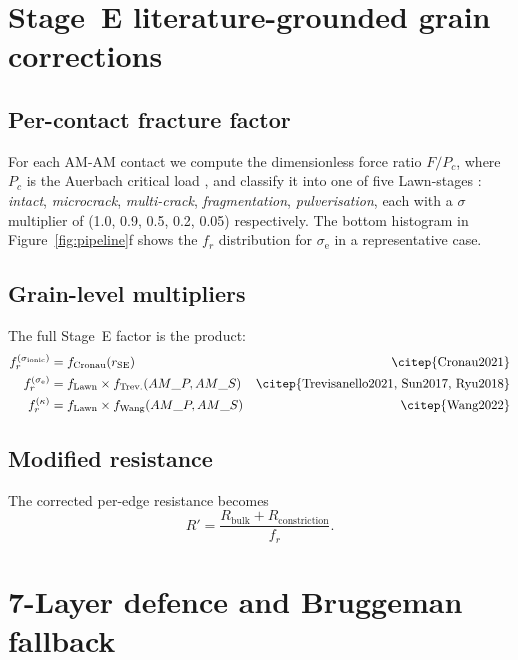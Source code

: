 \documentclass[11pt, a4paper]{article}
\newcommand{\sigmaionic}{\ensuremath{\sigma_{\mathrm{ionic}}}}
\newcommand{\sigmae}{\ensuremath{\sigma_{\mathrm{e}}}}
\newcommand{\Rbulk}{\ensuremath{R_{\mathrm{bulk}}}}
\newcommand{\Rconst}{\ensuremath{R_{\mathrm{constriction}}}}
\newcommand{\AMP}{AM\_P}
\newcommand{\AMS}{AM\_S}
\begin{document}
\section{Stage~E literature-grounded grain corrections}
\label{sec:stagee}

\subsection{Per-contact fracture factor}
For each AM-AM contact we compute the dimensionless force ratio
$F / P_c$, where $P_c$ is the Auerbach critical load
\citep{Auerbach1891}, and classify it into one of five Lawn-stages
\citep{Lawn1998}: \emph{intact}, \emph{microcrack},
\emph{multi-crack}, \emph{fragmentation}, \emph{pulverisation},
each with a $\sigma$ multiplier of (1.0, 0.9, 0.5, 0.2, 0.05)
respectively. The bottom histogram in Figure~\ref{fig:pipeline}f
shows the $f_r$ distribution for $\sigmae$ in a representative case.

\subsection{Grain-level multipliers}
The full Stage~E factor is the product:
\begin{align}
f_r^{(\sigmaionic)} &= f_{\mathrm{Cronau}}(r_{\mathrm{SE}})
   & \text{\citep{Cronau2021}} \\
f_r^{(\sigmae)}     &= f_{\mathrm{Lawn}} \times f_{\mathrm{Trev.}}(\AMP, \AMS)
   & \text{\citep{Trevisanello2021, Sun2017, Ryu2018}} \\
f_r^{(\kappa)}      &= f_{\mathrm{Lawn}} \times f_{\mathrm{Wang}}(\AMP, \AMS)
   & \text{\citep{Wang2022}}
\end{align}

\subsection{Modified resistance}
The corrected per-edge resistance becomes
\begin{equation}
R' = \frac{\Rbulk + \Rconst}{f_r}.
\label{eq:Rprime}
\end{equation}

\section{7-Layer defence and Bruggeman fallback}
\label{sec:defence}
\end{document}
